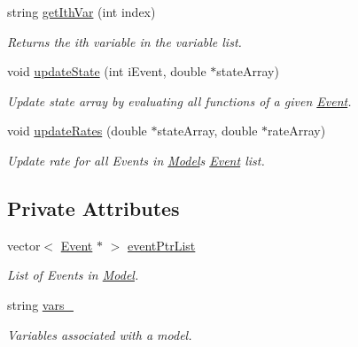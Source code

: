 \begin{DoxyCompactItemize}
string \hyperlink{class_model_adcb9dcc2d1d58f18d595f1476fc77b3b}{get\+Ith\+Var} (int index)
\begin{DoxyCompactList}\small\item\em Returns the ith variable in the variable list. \end{DoxyCompactList}\item 
void \hyperlink{class_model_ad9e7a181a31a2a9fab052d11b1984afd}{update\+State} (int i\+Event, double $\ast$state\+Array)
\begin{DoxyCompactList}\small\item\em Update state array by evaluating all functions of a given \hyperlink{class_event}{Event}. \end{DoxyCompactList}\item 
void \hyperlink{class_model_a3f2fd71261c87162718864d7efc67f2f}{update\+Rates} (double $\ast$state\+Array, double $\ast$rate\+Array)
\begin{DoxyCompactList}\small\item\em Update rate for all Events in \hyperlink{class_model}{Model}\textquotesingle{}s \hyperlink{class_event}{Event} list. \end{DoxyCompactList}\end{DoxyCompactItemize}
\subsection*{Private Attributes}
\begin{DoxyCompactItemize}
\item 
\mbox{\label{class_model_ab1a536085bce5b910dd354e396583db6}} 
vector$<$ \hyperlink{class_event}{Event} $\ast$ $>$ \hyperlink{class_model_ab1a536085bce5b910dd354e396583db6}{event\+Ptr\+List}
\begin{DoxyCompactList}\small\item\em List of Events in \hyperlink{class_model}{Model}. \end{DoxyCompactList}\item 
\mbox{\label{class_model_a713e115e1b8d997490d80d877ffb4740}} 
string \hyperlink{class_model_a713e115e1b8d997490d80d877ffb4740}{vars\+\_\+}
\begin{DoxyCompactList}\small\item\em Variables associated with a model. \end{DoxyCompactList}\end{DoxyCompactItemize}


